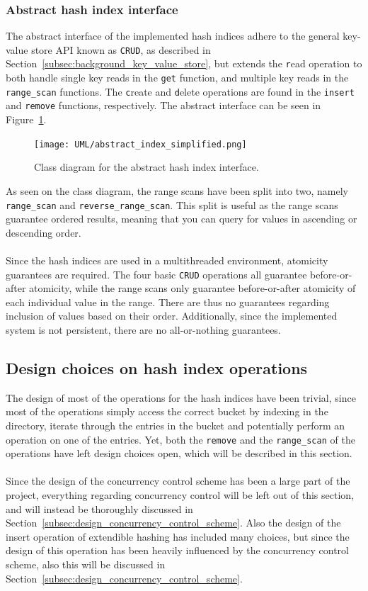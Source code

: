 \documentclass[11pt]{article} %
\begin{document}
\subsubsection{Abstract hash index interface}
\label{subsubsec:design_abstract_hash_index}
The abstract interface of the implemented hash indices adhere to the general key-value store API known as \verb|CRUD|, as described in Section~\ref{subsec:background_key_value_store}, but extends the \verb|r|ead operation to both handle single key reads in the \verb|get| function, and multiple key reads in the \verb|range_scan| functions. The \verb|c|reate and \verb|d|elete operations are found in the \verb|insert| and \verb|remove| functions, respectively. The abstract interface can be seen in Figure~\ref{fig:UML_abstract_hash_index}.

\begin{figure}[H]
  \centering
  \texttt{[image: UML/abstract\_index\_simplified.png]}\\
  \caption{Class diagram for the abstract hash index interface.}\label{fig:UML_abstract_hash_index}
\newpage
\end{figure}
\noindent
As seen on the class diagram, the range scans have been split into two, namely \verb|range_scan| and \verb|reverse_range_scan|. This split is useful as the range scans guarantee ordered results, meaning that you can query for values in ascending or descending order.\\
\\
Since the hash indices are used in a multithreaded environment, atomicity guarantees are required. The four basic \verb|CRUD| operations all guarantee before-or-after atomicity, while the range scans only guarantee before-or-after atomicity of each individual value in the range. There are thus no guarantees regarding inclusion of values based on their order. Additionally, since the implemented system is not persistent, there are no all-or-nothing guarantees.

\subsection{Design choices on hash index operations}
\label{subsec:design_anything_interesting_on_the_operations}
The design of most of the operations for the hash indices have been trivial, since most of the operations simply access the correct bucket by indexing in the directory, iterate through the entries in the bucket and potentially perform an operation on one of the entries. Yet, both the \verb|remove| and the \verb|range_scan| of the operations have left design choices open, which will be described in this section. \\
\\
Since the design of the concurrency control scheme has been a large part of the project, everything regarding concurrency control will be left out of this section, and will instead be thoroughly discussed in Section~\ref{subsec:design_concurrency_control_scheme}. Also the design of the insert operation of extendible hashing has included many choices, but since the design of this operation has been heavily influenced by the concurrency control scheme, also this will be discussed in Section~\ref{subsec:design_concurrency_control_scheme}.
\end{document}
